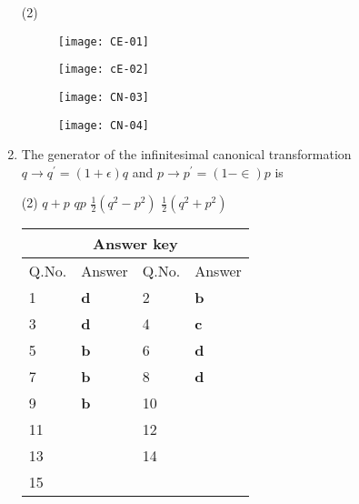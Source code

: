 \begin{enumerate}
	 \begin{tasks}(2)
		\task[\textbf{a.}]
		\begin{figure}[H]
			\centering
			\texttt{[image: CE-01]}
		\end{figure}
		\task[\textbf{b.}]	\begin{figure}[H]
			\centering
			\texttt{[image: cE-02]}
		\end{figure}
		\task[\textbf{c.}]
		\begin{figure}[H]
			\centering
			\texttt{[image: CN-03]}
		\end{figure}
		\task[\textbf{d.}] \begin{figure}[H]
			\centering
			\texttt{[image: CN-04]}
		\end{figure}
	\end{tasks}
	\item  The generator of the infinitesimal canonical transformation $q \rightarrow q^{\prime}=(1+\epsilon) q$ and $p \rightarrow p^{\prime}=(1-\in) p$ is
{}
	 \begin{tasks}(2)
		\task[\textbf{a.}] $q+p$
		\task[\textbf{b.}]$q p$
		\task[\textbf{c.}]$\frac{1}{2}\left(q^{2}-p^{2}\right)$
		\task[\textbf{d.}] $\frac{1}{2}\left(q^{2}+p^{2}\right)$
	\end{tasks}
	\setlength\arrayrulewidth{1pt}
	\begin{table}[H]
		\centering
		\begin{tabular}{|p{1.5cm}|p{1.5cm}||p{1.5cm}|p{1.5cm}|}
			\hline
			\multicolumn{4}{|c|}{\textbf{Answer key}}\\\hline\hline
			\rowcolor{ocrel}Q.No.&Answer&Q.No.&Answer\\\hline
			1&\textbf{d} &2&\textbf{b}\\\hline 
			3&\textbf{d} &4&\textbf{c} \\\hline
			5&\textbf{b} &6&\textbf{d} \\\hline
			7&\textbf{b}&8&\textbf{d}\\\hline
			9&\textbf{b}&10&\textbf{}\\\hline
			11&\textbf{} &12&\textbf{}\\\hline
			13&\textbf{}&14&\textbf{}\\\hline
			15&\textbf{}& &\\\hline
			
		\end{tabular}
	\end{table}
\end{enumerate}
